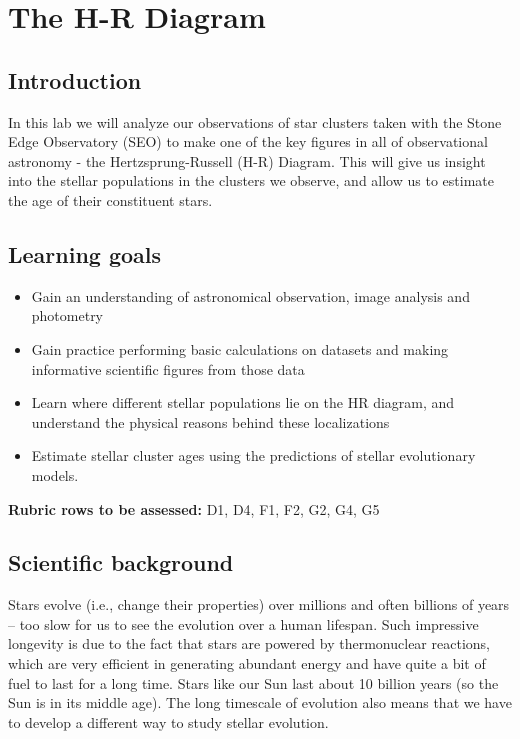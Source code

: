 \chapter{The H-R Diagram}

\section{Introduction}

In this lab we will analyze our observations of star clusters taken with the Stone Edge Observatory (SEO) to make one of the key figures in all of observational astronomy - the Hertzsprung-Russell (H-R) Diagram. This will give us insight into the stellar populations in the clusters we observe, and allow us to estimate the age of their constituent stars. 

\section{Learning goals}

\begin{itemize}
    \item Gain an understanding of astronomical observation, image analysis and photometry
	\item Gain practice performing basic calculations on datasets and making informative scientific figures from those data
	\item Learn where different stellar populations lie on the HR diagram, and understand the physical reasons behind these localizations
	\item Estimate stellar cluster ages using the predictions of stellar evolutionary models. 
\end{itemize}

\textbf{Rubric rows to be assessed:} D1, D4, F1, F2, G2, G4, G5

\section{Scientific background}

Stars evolve (i.e., change their properties) over millions and often billions of years – too slow for us to see the evolution over a human lifespan.  Such impressive longevity is due to the fact that stars are powered by thermonuclear reactions, which are very efficient in generating abundant energy and have quite a bit of fuel to last for a long time. Stars like our Sun last about 10 billion years (so the Sun is in its middle age). The long timescale of evolution also means that we have to develop a different way to study stellar evolution. 

